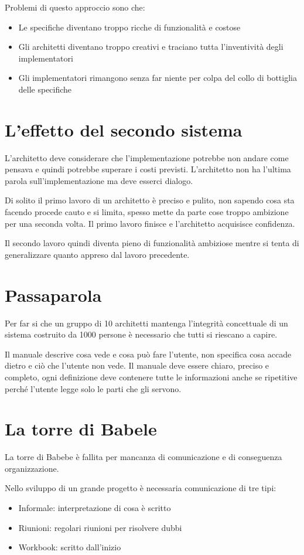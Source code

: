 \documentclass[a4paper,12pt,titlepage,oneside]{book}
\begin{document}
Problemi di questo approccio sono che:
\begin{itemize}
    \item Le specifiche diventano troppo ricche di funzionalità e costose
    \item Gli architetti diventano troppo creativi e traciano tutta l'inventività degli implementatori
    \item Gli implementatori rimangono senza far niente per colpa del collo di bottiglia delle specifiche
\end{itemize}
\section{L'effetto del secondo sistema}
L'architetto deve considerare che l'implementazione potrebbe non andare come pensava e quindi potrebbe superare i costi previsti. L'architetto non ha l'ultima parola sull'implementazione ma deve esserci dialogo.

Di solito il primo lavoro di un architetto è preciso e pulito, non sapendo cosa sta facendo procede cauto e si limita, spesso mette da parte cose troppo ambizione per una seconda volta. Il primo lavoro finisce e l'architetto acquisisce confidenza.

Il secondo lavoro quindi diventa pieno di funzionalità ambiziose mentre si tenta di generalizzare quanto appreso dal lavoro precedente.

\section{Passaparola}
Per far si che un gruppo di 10 architetti mantenga l'integrità concettuale di un sistema costruito da 1000 persone è necessario che tutti si riescano a capire.

Il manuale descrive cosa vede e cosa può fare l'utente, non specifica cosa accade dietro e ciò che l'utente non vede. Il manuale deve essere chiaro, preciso e completo, ogni definizione deve contenere tutte le informazioni anche se ripetitive perché l'utente legge solo le parti che gli servono.

\section{La torre di Babele}
La torre di Babebe è fallita per mancanza di comunicazione e di conseguenza organizzazione.

Nello sviluppo di un grande progetto è necessaria comunicazione di tre tipi:
\begin{itemize}
    \item Informale: interpretazione di cosa è scritto
    \item Riunioni: regolari riunioni per risolvere dubbi
    \item Workbook: scritto dall'inizio
\end{itemize}
\end{document}
